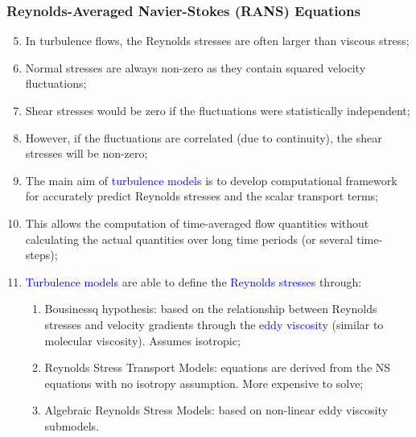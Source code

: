 \documentclass[10pt,compress,handout,ignorenonframetext]{beamer}
\newcommand{\blue}{\textcolor{blue}}
\begin{document}
\begin{frame}
 \frametitle{Reynolds-Averaged Navier-Stokes (RANS) Equations}
    \begin{enumerate}\setcounter{enumi}{4}%
       \item<1-> In turbulence flows, the Reynolds stresses are often larger than viscous stress;
       \item<1-> Normal stresses are always non-zero as they contain squared velocity fluctuations;
       \item<1-> Shear stresses would be zero if the fluctuations were statistically independent;
       \item<1-> However, if the fluctuations are correlated (due to continuity), the shear stresses will be non-zero;
       \item<2-> The main aim of \blue{turbulence models} is to develop computational framework for accurately predict Reynolds stresses and the scalar transport terms;
       \item<2-> This allows the computation of time-averaged flow quantities without calculating the actual quantities over long time periods (or several time-steps);
       \item<3-> \blue{Turbulence models} are able to define the \blue{Reynolds stresses} through:
           \begin{enumerate}
                \item<3-> Bousinessq hypothesis: based on the relationship between Reynolds stresses and velocity gradients through the \blue{eddy viscosity} (similar to molecular viscosity). Assumes isotropic;
                \item<3-> Reynolds Stress Transport Models: equations are derived from the NS equations with no isotropy assumption. More expensive to solve; 
                \item<3-> Algebraic Reynolds Stress Models: based on non-linear eddy viscosity submodels.
                 
           \end{enumerate}
    \end{enumerate} 
\end{frame}
\end{document}
